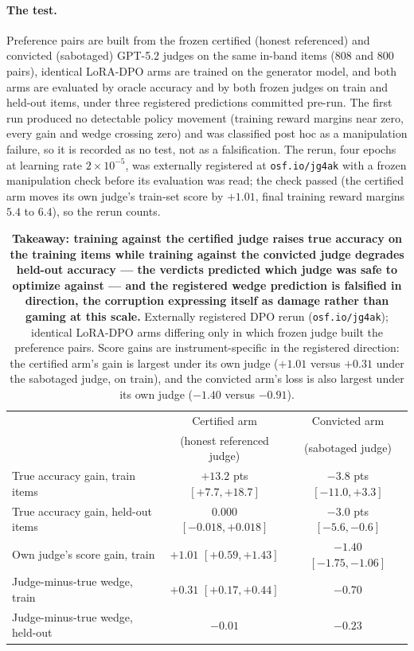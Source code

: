 \documentclass[11pt]{article}
\begin{document}
\paragraph{The test.}
Preference pairs are built from the frozen certified (honest referenced) and convicted (sabotaged) GPT-5.2 judges on the same in-band items (808 and 800 pairs), identical LoRA-DPO arms are trained on the generator model, and both arms are evaluated by oracle accuracy and by both frozen judges on train and held-out items, under three registered predictions committed pre-run.
The first run produced no detectable policy movement (training reward margins near zero, every gain and wedge crossing zero) and was classified post hoc as a manipulation failure, so it is recorded as no test, not as a falsification.
The rerun, four epochs at learning rate $2 \times 10^{-5}$, was externally registered at \texttt{osf.io/jg4ak} with a frozen manipulation check before its evaluation was read; the check passed (the certified arm moves its own judge's train-set score by $+1.01$, final training reward margins $5.4$ to $6.4$), so the rerun counts.

\begin{table}[tbp]
\centering
\small
\setlength{\tabcolsep}{5pt}
\begin{tabular}{lcc}
\toprule
& Certified arm & Convicted arm \\
& (honest referenced judge) & (sabotaged judge) \\
\midrule
True accuracy gain, train items & $\mathbf{+13.2}$ pts {\scriptsize$[+7.7, +18.7]$} & $-3.8$ pts {\scriptsize$[-11.0, +3.3]$} \\
True accuracy gain, held-out items & $0.000$ {\scriptsize$[-0.018, +0.018]$} & $\mathbf{-3.0}$ pts {\scriptsize$[-5.6, -0.6]$} \\
Own judge's score gain, train & $+1.01$ {\scriptsize$[+0.59, +1.43]$} & $-1.40$ {\scriptsize$[-1.75, -1.06]$} \\
Judge-minus-true wedge, train & $+0.31$ {\scriptsize$[+0.17, +0.44]$} & $-0.70$ \\
Judge-minus-true wedge, held-out & $-0.01$ & $-0.23$ \\
\bottomrule
\end{tabular}
\caption{\textbf{Takeaway: training against the certified judge raises true accuracy on the training items while training against the convicted judge degrades held-out accuracy --- the verdicts predicted which judge was safe to optimize against --- and the registered wedge prediction is falsified in direction, the corruption expressing itself as damage rather than gaming at this scale.}
Externally registered DPO rerun (\texttt{osf.io/jg4ak}); identical LoRA-DPO arms differing only in which frozen judge built the preference pairs.
Score gains are instrument-specific in the registered direction: the certified arm's gain is largest under its own judge ($+1.01$ versus $+0.31$ under the sabotaged judge, on train), and the convicted arm's loss is also largest under its own judge ($-1.40$ versus $-0.91$).}
\label{tab:dpo}
\end{table}
\end{document}
